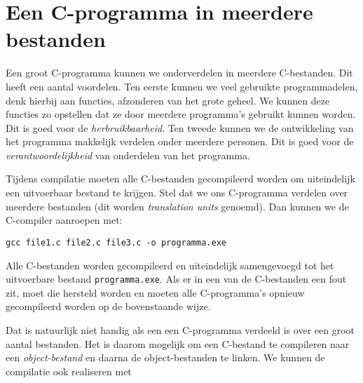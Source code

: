 \section{Een C-programma in meerdere bestanden}

Een groot C-programma kunnen we onderverdelen in meerdere C-bestanden. Dit heeft een aantal voordelen. Ten eerste kunnen we veel gebruikte programmadelen, denk hierbij aan functies, afzonderen van het grote geheel. We kunnen deze functies zo opstellen dat ze door meerdere programma's gebruikt kunnen worden. Dit is goed voor de \textsl{herbruikbaarheid}. Ten tweede kunnen we de ontwikkeling van het programma makkelijk verdelen onder meerdere personen. Dit is goed voor de \textsl{verantwoordelijkheid} van onderdelen van het programma.

Tijdens compilatie moeten alle C-bestanden gecompileerd worden om uiteindelijk een uitvoerbaar bestand te krijgen. Stel dat we ons C-programma verdelen over meerdere bestanden (dit worden \textsl{translation units} genoemd). Dan kunnen we de C-compiler aanroepen met:

\begin{lstlisting}[style=lstoneline]
gcc file1.c file2.c file3.c -o programma.exe
\end{lstlisting}

Alle C-bestanden worden gecompileerd en uiteindelijk samengevoegd tot het uitvoerbare bestand \texttt{programma.exe}.
Als er in een van de C-bestanden een fout zit, moet die hersteld worden en moeten alle C-programma's opnieuw gecompileerd worden op de bovenstaande wijze.

Dat is natuurlijk niet handig als een een C-programma verdeeld is over een groot aantal bestanden. Het is daarom mogelijk om een C-bestand te compileren naar een \textsl{object-bestand} en daarna de object-bestanden te linken. We kunnen de compilatie ook realiseren met

